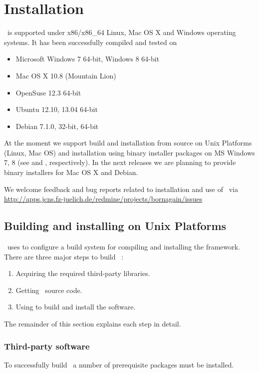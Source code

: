 \newpage
\chapter{Installation} 

\BornAgain\ is supported under x86/x86\_64 Linux, Mac OS X and Windows operating systems. 
It has been successfully compiled and tested on
\begin{itemize}
\item Microsoft Windows 7 64-bit, Windows 8 64-bit
\item Mac OS X 10.8 (Mountain Lion)
\item OpenSuse 12.3 64-bit
\item Ubuntu 12.10, 13.04 64-bit
\item Debian 7.1.0, 32-bit, 64-bit
\end{itemize}

At the moment we support build and installation from source on Unix Platforms 
(Linux, Mac OS) and
installation using binary installer packages on MS Windows 7, 8 (see
 and , respectively).
In the next releases we are planning to provide binary installers for 
Mac OS X and Debian.

We welcome feedback and bug reports related to
installation and use of \BornAgain\
 via \url{http://apps.jcns.fz-juelich.de/redmine/projects/bornagain/issues}


\section{Building and installing on Unix Platforms} 


\BornAgain\ uses  to configure a build system for compiling and installing the framework. There are three major steps to build \BornAgain\ :
\begin{enumerate}[1.]
\item Acquiring the required third-party libraries.
\item Getting \BornAgain\ source code.
\item Using  to build and install the software.
\end{enumerate}
The remainder of this section explains each step in detail.

\subsection{Third-party software}
To successfully build \BornAgain\ a number of prerequisite packages must be installed.

